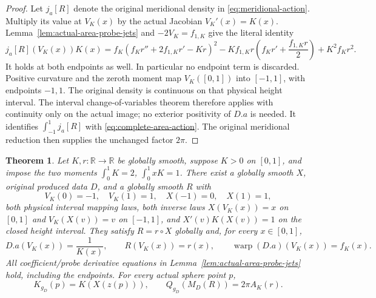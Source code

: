 \documentclass[11pt]{article}
\newtheorem{theorem}{Theorem}[section]
\newcommand{\R}{\mathbb R}
\begin{document}
\begin{proof}
Let $j_a[R]$ denote the original meridional density in
\eqref{eq:meridional-action}. Multiply its value at $V_K(x)$ by the actual
Jacobian $V_K'(x)=K(x)$. Lemma~\ref{lem:actual-area-probe-jets} and
$-2V_K=f_{1,K}$ give the literal identity
\[
 j_a[R](V_K(x))K(x)
 =f_K(f_Kr''+2f_{1,K}r'-Kr)^2
  -Kf_{1,K}r\left(f_Kr'+\frac{f_{1,K}r}{2}\right)
  +K^2f_Kr^2 .
\]
It holds at both endpoints as well. In particular no endpoint term is discarded.
Positive curvature and the zeroth moment map $V_K([0,1])$ into $[-1,1]$,
with endpoints $-1,1$. The original density is continuous on that physical
height interval. The interval change-of-variables theorem therefore applies
with continuity only on the actual image; no exterior positivity of $D.a$
is needed. It identifies $\int_{-1}^1j_a[R]$ with
\eqref{eq:complete-area-action}. The original meridional reduction then
supplies the unchanged factor $2\pi$.
\end{proof}

\begin{theorem}\label{thm:fully-tied-area-realization}
Let $K,r:\R\to\R$ be globally smooth, suppose $K>0$ on $[0,1]$, and impose
the two moments $\int_0^1K=2$, $\int_0^1xK=1$.
There exist a globally smooth $X$, original produced data $D$, and a
globally smooth $R$ with
\[
 V_K(0)=-1,\quad V_K(1)=1,\quad X(-1)=0,\quad X(1)=1,
\]
both physical interval mapping laws, both inverse laws
$X(V_K(x))=x$ on $[0,1]$ and $V_K(X(v))=v$ on $[-1,1]$, and
$X'(v)K(X(v))=1$ on the closed height interval. They satisfy $R=r\circ X$
globally and, for every $x\in[0,1]$,
\begin{equation}\label{eq:area-realization-tying}
 D.a(V_K(x))=\frac1{K(x)},\qquad
 R(V_K(x))=r(x),\qquad
 \operatorname{warp}(D.a)(V_K(x))=f_K(x).
\end{equation}
All coefficient/probe derivative equations in
Lemma~\ref{lem:actual-area-probe-jets} hold, including the endpoints.
For every actual sphere point $p$,
\begin{equation}\label{eq:area-realization-curvature-action}
 K_{g_D}(p)=K(X(z(p))),\qquad
 Q_{g_D}(M_D(R))=2\pi A_K(r).
\end{equation}
\end{theorem}
\end{document}
